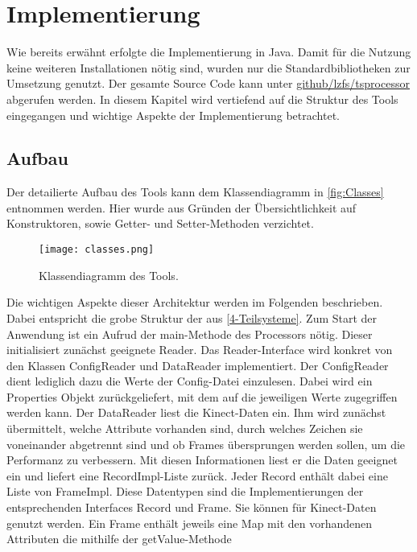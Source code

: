 \chapter{Implementierung}
\label{chapter5}

Wie bereits erwähnt erfolgte die Implementierung in Java.
Damit für die Nutzung keine weiteren Installationen nötig sind,
wurden nur die Standardbibliotheken zur Umsetzung genutzt.
Der gesamte Source Code kann unter \href{https://github.com/lzfs/tsprocessor}{github/lzfs/tsprocessor}
abgerufen werden.
In diesem Kapitel wird vertiefend auf die Struktur des Tools eingegangen
und wichtige Aspekte der Implementierung betrachtet.


\section{Aufbau}
\label{5-Aufbau}
Der detailierte Aufbau des Tools kann dem Klassendiagramm in \autoref{fig:Classes} entnommen werden.
Hier wurde aus Gründen der Übersichtlichkeit auf Konstruktoren,
sowie Getter- und Setter-Methoden verzichtet.
\begin{figure}[p]
    \begin{center}
        \texttt{[image: classes.png]}
    \end{center}
    \caption{Klassendiagramm des Tools.}
    \label{fig:Classes}
\end{figure}
Die wichtigen Aspekte dieser Architektur werden im Folgenden beschrieben.
Dabei entspricht die grobe Struktur der aus \autoref{4-Teilsysteme}.
Zum Start der Anwendung ist ein Aufrud der main-Methode des Processors nötig.
Dieser initialisiert zunächst geeignete Reader.
Das Reader-Interface wird konkret von den Klassen ConfigReader und DataReader implementiert.
Der ConfigReader dient lediglich dazu die Werte der Config-Datei einzulesen.
Dabei wird ein Properties Objekt zurückgeliefert,
mit dem auf die jeweiligen Werte zugegriffen werden kann.
Der DataReader liest die Kinect-Daten ein.
Ihm wird zunächst übermittelt, welche Attribute vorhanden sind,
durch welches Zeichen sie voneinander abgetrennt sind
und ob Frames übersprungen werden sollen,
um die Performanz zu verbessern.
Mit diesen Informationen liest er die Daten geeignet ein und liefert eine RecordImpl-Liste zurück.
Jeder Record enthält dabei eine Liste von FrameImpl.
Diese Datentypen sind die Implementierungen der entsprechenden Interfaces Record und Frame.
Sie können für Kinect-Daten genutzt werden.
Ein Frame enthält jeweils eine Map mit den vorhandenen Attributen die mithilfe der getValue-Methode
